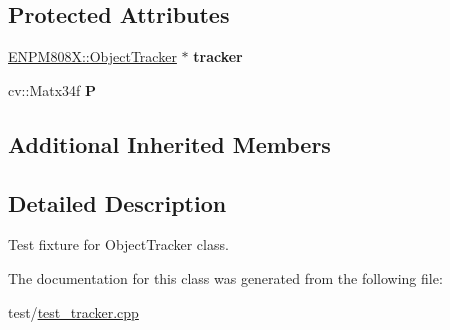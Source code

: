 \subsection*{Protected Attributes}
\begin{DoxyCompactItemize}
\item 
\mbox{\label{class_object_tracker_test_a90d12b495a8410f85bad256a62510716}} 
\hyperlink{class_e_n_p_m808_x_1_1_object_tracker}{E\+N\+P\+M808\+X\+::\+Object\+Tracker} $\ast$ {\bfseries tracker}
\item 
\mbox{\label{class_object_tracker_test_ad22082c97db202bdd6e4c029c297fde4}} 
cv\+::\+Matx34f {\bfseries P}
\end{DoxyCompactItemize}
\subsection*{Additional Inherited Members}


\subsection{Detailed Description}
Test fixture for Object\+Tracker class. 

The documentation for this class was generated from the following file\+:\begin{DoxyCompactItemize}
\item 
test/\hyperlink{test__tracker_8cpp}{test\+\_\+tracker.\+cpp}\end{DoxyCompactItemize}
